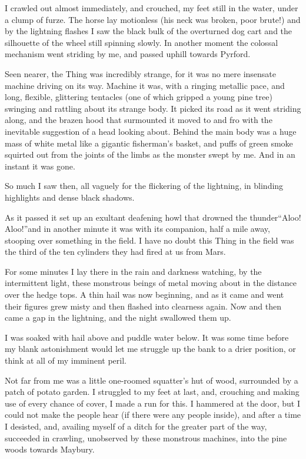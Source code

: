 I crawled out almost immediately, and crouched, my feet still in
the water, under a clump of furze. The horse lay motionless (his
neck was broken, poor brute!) and by the lightning flashes I saw
the black bulk of the overturned dog cart and the silhouette of the
wheel still spinning slowly. In another moment the colossal
mechanism went striding by me, and passed uphill towards Pyrford.

Seen nearer, the Thing was incredibly strange, for it was no mere
insensate machine driving on its way. Machine it was, with a
ringing metallic pace, and long, flexible, glittering tentacles
(one of which gripped a young pine tree) swinging and rattling
about its strange body. It picked its road as it went striding
along, and the brazen hood that surmounted it moved to and fro with
the inevitable suggestion of a head looking about. Behind the main
body was a huge mass of white metal like a gigantic fisherman's
basket, and puffs of green smoke squirted out from the joints of
the limbs as the monster swept by me. And in an instant it was
gone.

So much I saw then, all vaguely for the flickering of the
lightning, in blinding highlights and dense black shadows.

As it passed it set up an exultant deafening howl that drowned the
thunder\dash{}``Aloo! Aloo!''\dash{}and in another minute it was with its
companion, half a mile away, stooping over something in the field.
I have no doubt this Thing in the field was the third of the ten
cylinders they had fired at us from Mars.

For some minutes I lay there in the rain and darkness watching, by
the intermittent light, these monstrous beings of metal moving
about in the distance over the hedge tops. A thin hail was now
beginning, and as it came and went their figures grew misty and
then flashed into clearness again. Now and then came a gap in the
lightning, and the night swallowed them up.

I was soaked with hail above and puddle water below. It was some
time before my blank astonishment would let me struggle up the bank
to a drier position, or think at all of my imminent peril.

Not far from me was a little one-roomed squatter's hut of wood,
surrounded by a patch of potato garden. I struggled to my feet at
last, and, crouching and making use of every chance of cover, I
made a run for this. I hammered at the door, but I could not make
the people hear (if there were any people inside), and after a time
I desisted, and, availing myself of a ditch for the greater part of
the way, succeeded in crawling, unobserved by these monstrous
machines, into the pine woods towards Maybury.

